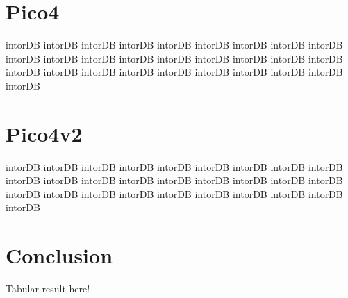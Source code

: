 		\section{Pico4}
		intorDB intorDB intorDB intorDB intorDB intorDB intorDB 
		intorDB intorDB intorDB intorDB intorDB intorDB intorDB 
		intorDB intorDB intorDB intorDB intorDB intorDB intorDB 
		intorDB intorDB intorDB intorDB intorDB intorDB intorDB 
		
		\section{Pico4v2}
		intorDB intorDB intorDB intorDB intorDB intorDB intorDB 
		intorDB intorDB intorDB intorDB intorDB intorDB intorDB 
		intorDB intorDB intorDB intorDB intorDB intorDB intorDB 
		intorDB intorDB intorDB intorDB intorDB intorDB intorDB 
		
		\section{Conclusion}
		Tabular result here!